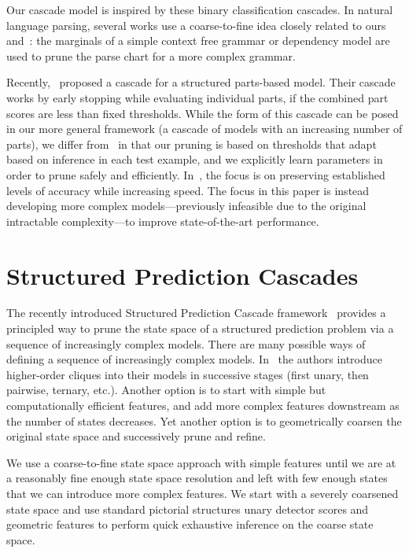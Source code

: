 Our cascade model is inspired by these binary classification cascades. In 
natural language parsing, several works \citep{carreras2008tag,petrov:PhD} use 
a coarse-to-fine idea closely related to ours and~\citet{geman2001}: the 
marginals of a simple context free grammar or dependency model are used to 
prune the parse chart for a more complex grammar.

Recently,~\citet{pff-cascade} proposed a cascade for a structured parts-based 
model.  Their cascade works by early stopping while evaluating individual 
parts, if the combined part scores are less than fixed thresholds.  While the 
form of this cascade can be posed in our more general framework (a cascade of 
models with an increasing number of parts), we differ from~\citet{pff-cascade} 
in that our pruning is based on thresholds that adapt based on inference in 
each test example, and we explicitly learn parameters in order to prune safely 
and efficiently. In~\citet{geman2001,viola02,pff-cascade}, the focus is on 
preserving established levels of accuracy while increasing speed.  The focus in 
this paper is instead developing more complex models---previously infeasible 
due to the original intractable complexity---to improve state-of-the-art 
performance.



\section{Structured Prediction Cascades} \label{sec:SPC}
The recently introduced Structured Prediction Cascade 
framework~\citep{cascades} provides a principled way to prune the state space 
of a structured prediction problem via a sequence of increasingly complex 
models.
There are many possible ways of defining a sequence of increasingly complex 
models.  In~\cite{cascades} the authors introduce higher-order cliques into 
their models in successive stages (first unary, then pairwise, ternary, etc.).  
Another option is to start with simple but computationally efficient features, 
and add more complex features downstream as the number of states decreases.  
Yet another option is to geometrically coarsen the original state space and 
successively prune and refine.

We use a coarse-to-fine state space approach with simple features until we are 
at a reasonably fine enough state space resolution and left with few enough 
states that we can introduce more complex features.  We start with a severely 
coarsened state space and use standard pictorial structures unary detector 
scores and geometric features to perform quick exhaustive inference on the 
coarse state space.  

